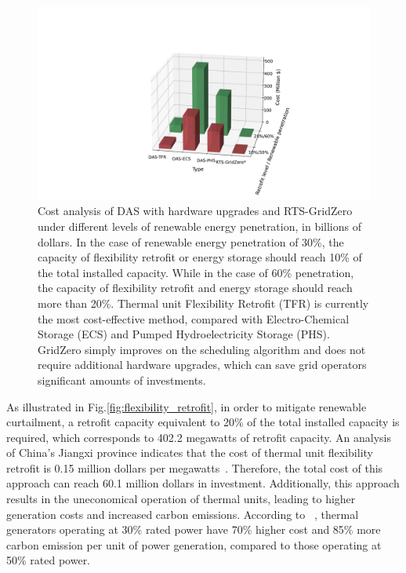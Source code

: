 \begin{figure}[h]
    \centering
    \includegraphics[width=1.0\linewidth]{fig/cost_analysis.pdf}
    \caption{Cost analysis of DAS with hardware upgrades and RTS-GridZero under different levels of renewable energy penetration, in billions of dollars. 
    In the case of renewable energy penetration of 30\%, the capacity of flexibility retrofit or energy storage should reach 10\% of the total installed capacity. While in the case of 60\% penetration, the capacity of flexibility retrofit and energy storage should reach more than 20\%.
    Thermal unit Flexibility Retrofit (TFR) is currently the most cost-effective method, compared with Electro-Chemical Storage (ECS) and Pumped Hydroelectricity Storage (PHS). GridZero simply improves on the scheduling algorithm and does not require additional hardware upgrades, which can save grid operators significant amounts of investments.}
    \label{fig:cost}
\end{figure}

As illustrated in Fig.\ref{fig:flexibility_retrofit}, in order to mitigate renewable curtailment, a retrofit capacity equivalent to 20\% of the total installed capacity is required, which corresponds to 402.2 megawatts of retrofit capacity.
An analysis of China's Jiangxi province indicates that the cost of thermal unit flexibility retrofit is 0.15 million dollars per megawatts~\cite{chen2021flexible}.
Therefore, the total cost of this approach can reach 60.1 million dollars in investment. Additionally, this approach results in the uneconomical operation of thermal units, leading to higher generation costs and increased carbon emissions. According to ~\cite{chen2021flexible}, thermal generators operating at 30\% rated power have 70\% higher cost and 85\% more carbon emission per unit of power generation, compared to those operating at 50\% rated power.

